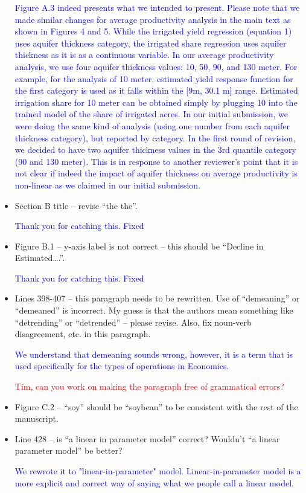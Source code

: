 \documentclass[
]{article}
\begin{document}
\begin{itemize}
\textcolor{blue}{Figure A.3 indeed presents what we intended to present. Please note that we made similar changes for average productivity analysis in the main text as shown in Figures 4 and 5. While the irrigated yield regression (equation 1) uses aquifer thickness category, the irrigated share regression uses aquifer thickness as it is as a continuous variable. In our average productivity analysis, we use four aquifer thickness values: 10, 50, 90, and 130 meter. For example, for the analysis of 10 meter, estimated yield response function for the first category is used as it falls within the [9m, 30.1 m] range. Estimated irrigation share for 10 meter can be obtained simply by plugging 10 into the trained model of the share of irrigated acres. In our initial submission, we were doing the same kind of analysis (using one number from each aquifer thickness category), but reported by category. In the first round of revision, we decided to have two aquifer thickness values in the 3rd quantile category (90 and 130 meter). This is in response to another reviewer's point that it is not clear if indeed the impact of aquifer thickness on average productivity is non-linear as we claimed in our initial submission.}

\item Section B title – revise ``the the''.

\textcolor{blue}{Thank you for catching this. Fixed}

\item Figure B.1 – y-axis label is not correct – this should be ``Decline in Estimated….''.

\textcolor{blue}{Thank you for catching this. Fixed}

\item Lines 398-407 – this paragraph needs to be rewritten. Use of ``demeaning'' or ``demeaned'' is incorrect. My guess is that the authors mean something like ``detrending'' or ``detrended'' – please revise. Also, fix noun-verb disagreement, etc. in this paragraph.

\textcolor{blue}{We understand that demeaning sounds wrong, however, it is a term that is used specifically for the types of operations in Economics.}

\textcolor{red}{Tim, can you work on making the paragraph free of grammatical errors?}

\item Figure C.2 – ``soy'' should be ``soybean'' to be consistent with the rest of the manuscript.

\item Line 428 – is ``a linear in parameter model'' correct? Wouldn’t ``a linear parameter model'' be better?

\textcolor{blue}{We rewrote it to "linear-in-parameter" model. Linear-in-parameter model is a more explicit and correct way of saying what we people call a linear model.}

\end{itemize}
\end{document}
